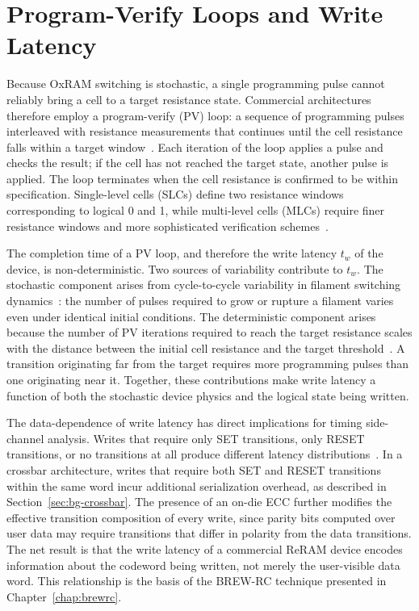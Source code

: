 \section{Program-Verify Loops and Write Latency}
\label{sec:bg-pvloops}

Because OxRAM switching is stochastic, a single programming pulse cannot
reliably bring a cell to a target resistance state. Commercial
architectures therefore employ a program-verify (PV) loop: a sequence of
programming pulses interleaved with resistance measurements that
continues until the cell resistance falls within a target
window~\cite{kawahara2013filament, milo2021accurate}. Each iteration of
the loop applies a pulse and checks the result; if the cell has not
reached the target state, another pulse is applied. The loop terminates
when the cell resistance is confirmed to be within specification.
Single-level cells (SLCs) define two resistance windows corresponding to
logical 0 and 1, while multi-level cells (MLCs) require finer resistance
windows and more sophisticated verification schemes~\cite{hung2021mlc}.

The completion time of a PV loop, and therefore the write latency $t_w$
of the device, is non-deterministic. Two sources of variability
contribute to $t_w$. The stochastic component arises from cycle-to-cycle
variability in filament switching dynamics~\cite{6582090, 6724732}: the
number of pulses required to grow or rupture a filament varies even
under identical initial conditions. The deterministic component arises
because the number of PV iterations required to reach the target
resistance scales with the distance between the initial cell resistance
and the target threshold~\cite{yu2012switching, kawahara2013filament}. A
transition originating far from the target requires more programming
pulses than one originating near it. Together, these contributions make
write latency a function of both the stochastic device physics and the
logical state being written.

The data-dependence of write latency has direct implications for timing
side-channel analysis. Writes that require only SET transitions, only
RESET transitions, or no transitions at all produce different latency
distributions~\cite{yu2012switching}. In a crossbar architecture, writes
that require both SET and RESET transitions within the same word incur
additional serialization overhead, as described in
Section~\ref{sec:bg-crossbar}. The presence of an on-die ECC further
modifies the effective transition composition of every write, since
parity bits computed over user data may require transitions that differ
in polarity from the data transitions. The net result is that the write
latency of a commercial ReRAM device encodes information about the
codeword being written, not merely the user-visible data word. This
relationship is the basis of the BREW-RC technique presented in
Chapter~\ref{chap:brewrc}.